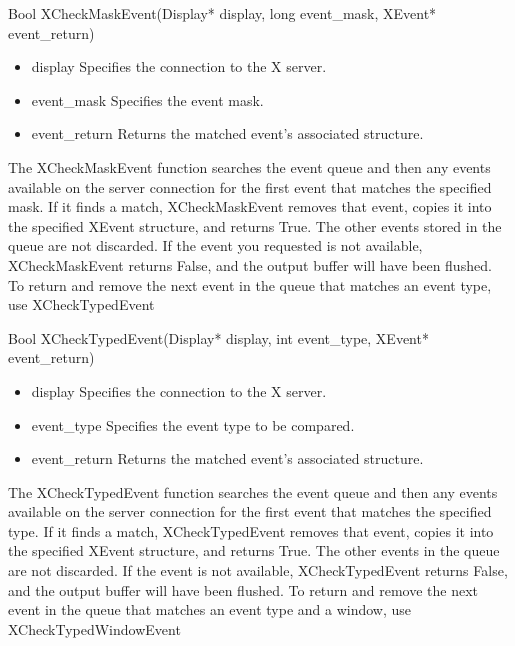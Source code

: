 \documentclass{report}
\begin{document}
\begin{itemize}
            \begin{cppcode}
            Bool XCheckMaskEvent(Display* display, long event_mask, XEvent* event_return)
            \end{cppcode}
            \begin{itemize}
                \item display Specifies the connection to the X server.
                \item event\_mask Specifies the event mask.
                \item event\_return Returns the matched event’s associated structure.
            \end{itemize}
            The XCheckMaskEvent function searches the event queue and then any events available on the server connection for the first event that matches the specified mask. If it finds a match,
            \bigbreak \noindent 
            XCheckMaskEvent removes that event, copies it into the specified XEvent structure, and returns True. The other events stored in the queue are not discarded. If the event you requested is not available, XCheckMaskEvent returns False, and the output buffer will have been flushed.
            \bigbreak \noindent 
            To return and remove the next event in the queue that matches an event type, use XCheckTypedEvent
            \bigbreak \noindent 
            \begin{cppcode}
                Bool XCheckTypedEvent(Display* display, int event_type, XEvent* event_return)
            \end{cppcode}
            \begin{itemize}
                \item display Specifies the connection to the X server.
                \item event\_type Specifies the event type to be compared.
                \item event\_return Returns the matched event’s associated structure.
            \end{itemize}
            The XCheckTypedEvent function searches the event queue and then any events available on the server connection for the first event that matches the specified type. If it finds a match, XCheckTypedEvent removes that event, copies it into the specified XEvent structure, and returns True. The other events in the queue are not discarded. If the event is not available, XCheckTypedEvent returns False, and the output buffer will have been flushed.
            \bigbreak \noindent 
            To return and remove the next event in the queue that matches an event type and a window, use XCheckTypedWindowEvent

\end{itemize}
\end{document}
